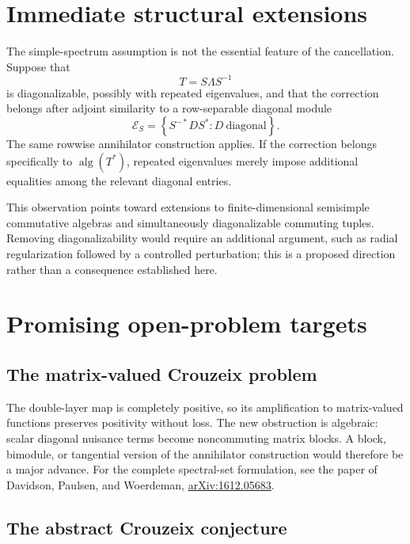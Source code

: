 \documentclass[11pt]{article}
\newcommand{\alg}{\operatorname{alg}}
\begin{document}
\section{Immediate structural extensions}

The simple-spectrum assumption is not the essential feature of the
cancellation.  Suppose that
\begin{equation}
 T=S\Lambda S^{-1}
 \label{eq:diagonalization}
\end{equation}
is diagonalizable, possibly with repeated eigenvalues, and that the
correction belongs after adjoint similarity to a row-separable
diagonal module
\begin{equation}
 \mathcal E_S=
 \left\{S^{-*}DS^*:D\ \text{diagonal}\right\}.
 \label{eq:row-separable-module}
\end{equation}
The same rowwise annihilator construction applies.  If the correction
belongs specifically to \(\alg(T^*)\), repeated eigenvalues merely
impose additional equalities among the relevant diagonal entries.

This observation points toward extensions to finite-dimensional
semisimple commutative algebras and simultaneously diagonalizable
commuting tuples.  Removing diagonalizability would require an
additional argument, such as radial regularization followed by a
controlled perturbation; this is a proposed direction rather than a
consequence established here.

\section{Promising open-problem targets}

\subsection{The matrix-valued Crouzeix problem}

The double-layer map is completely positive, so its amplification to
matrix-valued functions preserves positivity without loss.  The new
obstruction is algebraic: scalar diagonal nuisance terms become
noncommuting matrix blocks.  A block, bimodule, or tangential version
of the annihilator construction would therefore be a major advance.
For the complete spectral-set formulation, see the paper of
Davidson, Paulsen, and Woerdeman,
\href{https://arxiv.org/abs/1612.05683}{arXiv:1612.05683}.

\subsection{The abstract Crouzeix conjecture}
\end{document}
